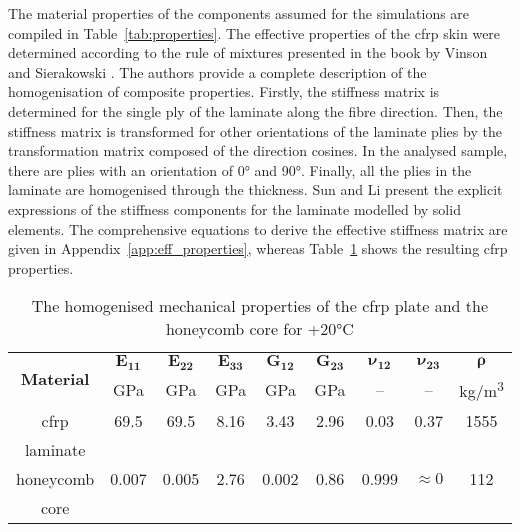 \documentclass[11pt,a4paper,final]{report}
\theoremstyle{plain}
\begin{document}
The material properties of the components assumed for the simulations are compiled in Table~\ref{tab:properties}.
The effective properties of the \ac{cfrp} skin were determined according to the rule of mixtures presented in the book by Vinson and Sierakowski \cite{vinson1993behavior}.
The authors provide a complete description of the homogenisation of composite properties.
Firstly, the stiffness matrix is determined for the single ply of the laminate along the fibre direction.
Then, the stiffness matrix is transformed for other orientations of the laminate plies by the transformation matrix composed of the direction cosines.
In the analysed sample, there are plies with an orientation of \ang{0} and \ang{90}.
Finally, all the plies in the laminate are homogenised through the thickness.
Sun and Li \cite{sun1988three} present the explicit expressions of the stiffness components for the laminate modelled by solid elements.
The comprehensive equations to derive the effective stiffness matrix are given in Appendix~\ref{app:eff_properties}, whereas Table~\ref{tab:properties_eff} shows the resulting \ac{cfrp} properties.
\begin{table}[H]
	\centering
	\small
	\tabcolsep=0.25cm
	\caption{\label{tab:properties_eff} The homogenised mechanical properties of the \acs{cfrp} plate and the honeycomb core for +20\unit{\degreeCelsius}}
	\begin{tabular}{ccccccccc}
		\toprule
		\multirow{2}{*}{\textbf{Material}} & \(\boldsymbol{E_{11}}\) & \(\boldsymbol{E_{22}}\) & \(\boldsymbol{E_{33}}\) & \(\boldsymbol{G_{12}}\) & \(\boldsymbol{G_{23}}\) & \(\boldsymbol{\nu_{12}}\)	& \(\boldsymbol{\nu_{23}}\) & \(\boldsymbol{\rho}\) \\
		& \unit{\giga\pascal} & \unit{\giga\pascal} & \unit{\giga\pascal} & \unit{\giga\pascal} & \unit{\giga\pascal} & -- & -- & \unit[per-mode = symbol]
		{\kilogram\per\cubic\metre}\\
		\midrule
		\ac{cfrp} & 69.5 & 69.5 & 8.16 & 3.43 & 2.96 & 0.03 & 0.37 & 1555\\
		laminate & & & & & & & &\\
		\midrule
		honeycomb & 0.007 & 0.005 & 2.76 & 0.002 & 0.86 & 0.999 & \(\approx0\) & 112\\
		core & & & & & & & &\\
		\bottomrule
	\end{tabular}
\end{table}
\label{sec:honeycomb}
\end{document}
